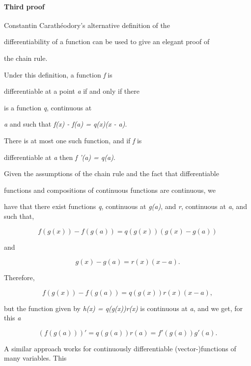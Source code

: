 {\paragraph{Third proof}



Constantin Carathéodory's alternative definition of the

differentiability of a function can be used to give an elegant proof of

the chain rule.



Under this definition, a function \textit{f} is

differentiable at a point \textit{a} if and only if there

is a function \textit{q}, continuous at

\textit{a} and such that \textit{f(x) - f(a) = q(x)(x - a)}.

There is at most one such function, and if \textit{f} is

differentiable at \textit{a} then \textit{f '(a) = q(a)}.



Given the assumptions of the chain rule and the fact that differentiable

functions and compositions of continuous functions are continuous, we

have that there exist functions \textit{q}, continuous at \textit{g(a)}, and \textit{r}, continuous at \textit{a}, and such that,



$$f(g(x))-f(g(a))=q(g(x))(g(x)-g(a))$$



and



$$g(x)-g(a)=r(x)(x-a).$$



Therefore,



$$f(g(x))-f(g(a))=q(g(x))r(x)(x-a),$$



but the function given by \textit{h(x) = q(g(x))r(x)} is continuous at \textit{a}, and we get, for this \textit{a}



$$(f(g(a)))'=q(g(a))r(a)=f'(g(a))g'(a).$$



A similar approach works for continuously differentiable (vector-)functions of many variables. This

}
